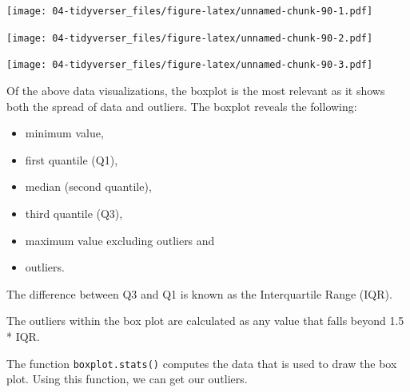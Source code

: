 \documentclass[
]{book}
\newenvironment{Shaded}{\begin{snugshade}}{\end{snugshade}}
\newcommand{\CommentTok}[1]{\textcolor[rgb]{0.56,0.35,0.01}{\textit{#1}}}
\newcommand{\FunctionTok}[1]{\textcolor[rgb]{0.00,0.00,0.00}{#1}}
\newcommand{\NormalTok}[1]{#1}
\newcommand{\SpecialCharTok}[1]{\textcolor[rgb]{0.00,0.00,0.00}{#1}}
\providecommand{\tightlist}{%
  \setlength{\itemsep}{0pt}\setlength{\parskip}{0pt}}
\begin{document}
\texttt{[image: 04-tidyverser\_files/figure-latex/unnamed-chunk-90-1.pdf]}

\begin{Shaded}
\end{Shaded}

\texttt{[image: 04-tidyverser\_files/figure-latex/unnamed-chunk-90-2.pdf]}

\begin{Shaded}
\end{Shaded}

\texttt{[image: 04-tidyverser\_files/figure-latex/unnamed-chunk-90-3.pdf]}

Of the above data visualizations, the boxplot is the most relevant as it shows both the spread of data and outliers. The boxplot reveals the following:

\begin{itemize}
\tightlist
\item
  minimum value,
\item
  first quantile (Q1),
\item
  median (second quantile),
\item
  third quantile (Q3),
\item
  maximum value excluding outliers and
\item
  outliers.
\end{itemize}

The difference between Q3 and Q1 is known as the Interquartile Range (IQR).

The outliers within the box plot are calculated as any value that falls beyond 1.5 * IQR.

The function \texttt{boxplot.stats()} computes the data that is used to draw the box plot. Using this function, we can get our outliers.

\begin{Shaded}
\end{Shaded}
\end{document}
